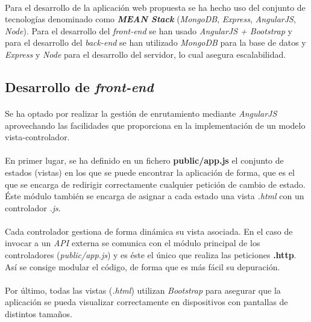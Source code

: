 \documentclass[a4paper]{article}
\begin{document}
	\paragraph{} Para el desarrollo de la aplicación web propuesta se ha hecho uso del conjunto de tecnologías denominado como \textbf{\textit{MEAN Stack}} (\textit{MongoDB}, \textit{Express}, \textit{AngularJS}, \textit{Node}). Para el desarrollo del \textit{front-end} se han usado \textit{AngularJS + Bootstrap} y para el desarrollo del \textit{back-end} se han utilizado \textit{MongoDB} para la base de datos y \textit{Express} y \textit{Node} para el desarrollo del servidor, lo cual asegura escalabilidad.

	\subsection{Desarrollo de \textit{front-end}}
	
		\paragraph{} Se ha optado por realizar la gestión de enrutamiento mediante \textit{AngularJS} aprovechando las facilidades que proporciona en la implementación de un modelo vista-controlador.
		
		\paragraph{} En primer lugar, se ha definido en un fichero \textbf{public/app.js} el conjunto de estados (vistas) en los que se puede encontrar la aplicación de forma, que es el que se encarga de redirigir correctamente cualquier petición de cambio de estado. Éste módulo también se encarga de asignar a cada estado una vista \textit{.html} con un controlador \textit{.js}.
	
		\paragraph{} Cada controlador gestiona de forma dinámica su vista asociada. En el caso de invocar a un \textit{API} externa se comunica con el módulo principal de los controladores (\textit{public/app.js}) y es éste el único que realiza las peticiones \textbf{.http}. Así se consige modular el código, de forma que es más fácil su depuración.
	
		\paragraph{} Por último, todas las vistas (\textit{.html}) utilizan \textit{Bootstrap} para asegurar que la aplicación se pueda visualizar correctamente en dispositivos con pantallas de distintos tamaños.
		
\end{document}
